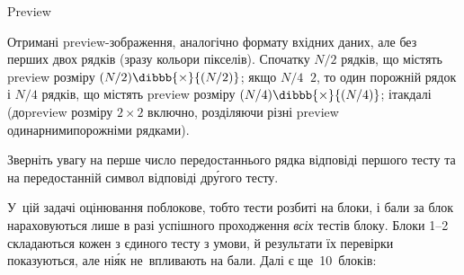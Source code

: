 {\begin{problemAllDefault}{Preview}
{\OutputFile
От\-ри\-мані pre\-view-зо\-бра\-же\-ння, аналогічно формату вхідних даних, але без перших двох рядків (зразу кольори пікселів). Спочатку $N/2$ рядків, що містять preview розміру ${(N/2)}\dibbb{{\times}}{(N/2)}$; якщо ${N/4\,{\>}\,2}$, то один порожній рядок і $N/4$ рядків, що містять preview розміру ${(N/4)}\dibbb{{\times}}{(N/4)}$; і\nolinebreak[3] так\nolinebreak[3] далі (до\nolinebreak[3] preview розміру $2{\times}2$ включно, розділяючи різні preview одинарними\nolinebreak[2] по\-рож\-німи рядками).

\Notes 
Зверніть увагу на перше число передостаннього рядка відповіді першого тесту та на передостанній символ відповіді др\'{у}гого тесту.

\Scoring
У~цій задачі оцінювання поблокове, тобто тести розбиті на блоки, і бали за блок нараховуються лише в разі успішного проходження \emph{всіх} тестів блоку. Блоки 1--2 складаються кожен з єдиного тесту з умови, й результати їх перевірки показуються, але ні\'{я}к не~впливають на бали. Далі є ще~10~блоків:

}

\def\block#1#2#3#4{\begin{small}\begin{tabular}{@{}c}блок #1\\\begin{scriptsize}{тести~}\end{scriptsize}#2\\\begin{large}#3\%\end{large}\scriptsize{~балів}\end{tabular}\end{small}\begin{footnotesize}\begin{minipage}{0.125\textwidth}#4\end{minipage}\end{footnotesize}}


\end{problemAllDefault}}
